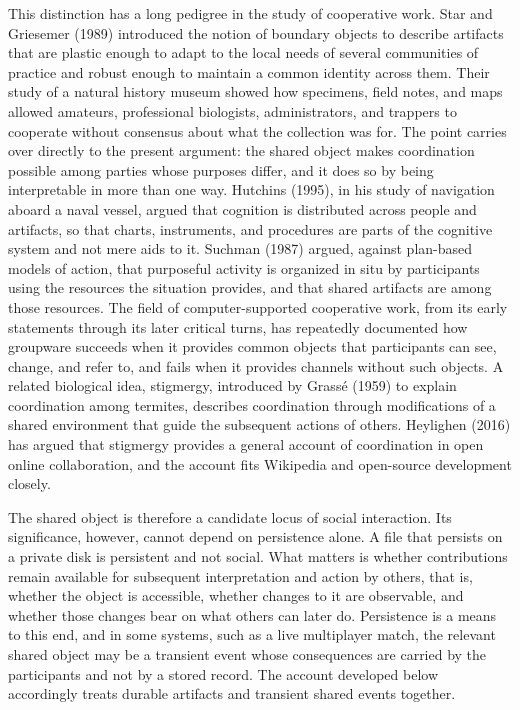 \documentclass[11pt]{article}
\theoremstyle{remark}
\begin{document}
This distinction has a long pedigree in the study of cooperative work. Star and Griesemer (1989) introduced the notion of boundary objects to describe artifacts that are plastic enough to adapt to the local needs of several communities of practice and robust enough to maintain a common identity across them. Their study of a natural history museum showed how specimens, field notes, and maps allowed amateurs, professional biologists, administrators, and trappers to cooperate without consensus about what the collection was for. The point carries over directly to the present argument: the shared object makes coordination possible among parties whose purposes differ, and it does so by being interpretable in more than one way. Hutchins (1995), in his study of navigation aboard a naval vessel, argued that cognition is distributed across people and artifacts, so that charts, instruments, and procedures are parts of the cognitive system and not mere aids to it. Suchman (1987) argued, against plan-based models of action, that purposeful activity is organized in situ by participants using the resources the situation provides, and that shared artifacts are among those resources. The field of computer-supported cooperative work, from its early statements through its later critical turns, has repeatedly documented how groupware succeeds when it provides common objects that participants can see, change, and refer to, and fails when it provides channels without such objects. A related biological idea, stigmergy, introduced by Grass\'e (1959) to explain coordination among termites, describes coordination through modifications of a shared environment that guide the subsequent actions of others. Heylighen (2016) has argued that stigmergy provides a general account of coordination in open online collaboration, and the account fits Wikipedia and open-source development closely.

The shared object is therefore a candidate locus of social interaction. Its significance, however, cannot depend on persistence alone. A file that persists on a private disk is persistent and not social. What matters is whether contributions remain available for subsequent interpretation and action by others, that is, whether the object is accessible, whether changes to it are observable, and whether those changes bear on what others can later do. Persistence is a means to this end, and in some systems, such as a live multiplayer match, the relevant shared object may be a transient event whose consequences are carried by the participants and not by a stored record. The account developed below accordingly treats durable artifacts and transient shared events together.
\end{document}
